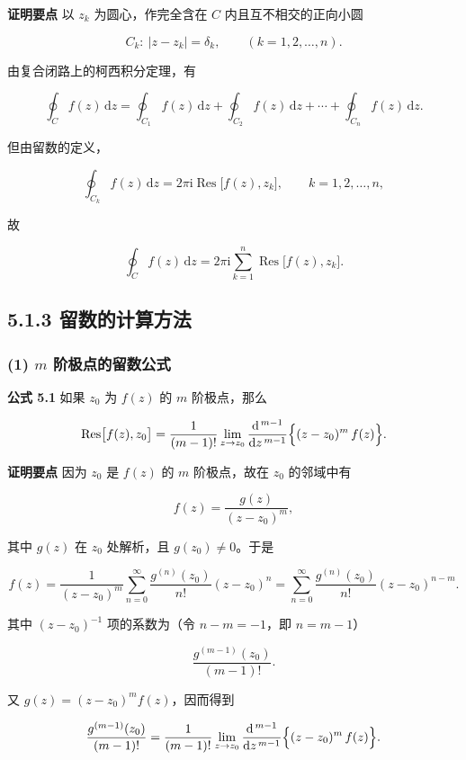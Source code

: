 \textbf{证明要点} 以 \(z_k\) 为圆心，作完全含在 \(C\)
内且互不相交的正向小圆

\[
C_k:\ |z-z_k|=\delta_k,\qquad (k=1,2,\ldots,n).
\]

由复合闭路上的柯西积分定理，有

\[
\oint_C f(z)\,\mathrm dz
=\oint_{C_1} f(z)\,\mathrm dz
+\oint_{C_2} f(z)\,\mathrm dz
+\cdots+\oint_{C_n} f(z)\,\mathrm dz .
\]

但由留数的定义，

\[
\oint_{C_k} f(z)\,\mathrm dz=2\pi\mathrm i\operatorname{Res}\bigl[f(z),z_k\bigr],\qquad k=1,2,\ldots,n,
\]

故

\[
\oint_C f(z)\,\mathrm dz
=2\pi\mathrm i\sum_{k=1}^{n}\operatorname{Res}\bigl[f(z),z_k\bigr].
\]

\subsection{5.1.3
留数的计算方法}\label{ux7559ux6570ux7684ux8ba1ux7b97ux65b9ux6cd5}

\subsubsection{\texorpdfstring{(1) \(m\)
阶极点的留数公式}{(1) m 阶极点的留数公式}}\label{m-ux9636ux6781ux70b9ux7684ux7559ux6570ux516cux5f0f}

\textbf{公式 5.1} 如果 \(z_0\) 为 \(f(z)\) 的 \(m\) 阶极点，那么

\[
\operatorname{Res}\bigl[f(z),z_0\bigr]
=\frac{1}{(m-1)!}\lim_{z\to z_0}\frac{\mathrm d^{\,m-1}}{\mathrm d z^{\,m-1}}
\Bigl\{(z-z_0)^{m}\,f(z)\Bigr\}.
\]

\textbf{证明要点} 因为 \(z_0\) 是 \(f(z)\) 的 \(m\) 阶极点，故在 \(z_0\)
的邻域中有

\[
f(z)=\frac{g(z)}{(z-z_0)^{m}},
\]

其中 \(g(z)\) 在 \(z_0\) 处解析，且 \(g(z_0)\neq0\)。于是

\[
f(z)=\frac{1}{(z-z_0)^{m}}\sum_{n=0}^{\infty}\frac{g^{(n)}(z_0)}{n!}(z-z_0)^{n}
=\sum_{n=0}^{\infty}\frac{g^{(n)}(z_0)}{n!}(z-z_0)^{n-m}.
\]

其中 \((z-z_0)^{-1}\) 项的系数为（令 \(n-m=-1\)，即 \(n=m-1\)）

\[
\frac{g^{(m-1)}(z_0)}{(m-1)!}.
\]

又 \(g(z)=(z-z_0)^{m}f(z)\)，因而得到

\[
\frac{g^{(m-1)}(z_0)}{(m-1)!}
=\frac{1}{(m-1)!}\lim_{z\to z_0}\frac{\mathrm d^{\,m-1}}{\mathrm d z^{\,m-1}}
\Bigl\{(z-z_0)^{m}\,f(z)\Bigr\}.
\]

